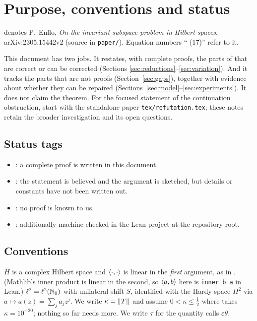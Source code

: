 \section{Purpose, conventions and status}

\paper{} denotes P.~Enflo, \emph{On the invariant subspace problem in Hilbert spaces},
arXiv:2305.15442v2 (source in \texttt{paper/}). Equation numbers ``\paper{} (17)'' refer to it.

This document has two jobs. It restates, with complete proofs, the parts of \paper{} that are
correct or can be corrected (Sections \ref{sec:reductions}--\ref{sec:variation}). And it tracks
the parts that are not proofs (Section~\ref{sec:gaps}), together with evidence about whether they
can be repaired (Sections~\ref{sec:model}--\ref{sec:experiments}). It does not claim the theorem.
For the focused statement of the continuation obstruction, start with the standalone paper
\texttt{tex/refutation.tex}; these notes retain the broader investigation and its open questions.

\subsection*{Status tags}
\begin{itemize}[leftmargin=2em]
\item \stproved: a complete proof is written in this document.
\item \stoutline: the statement is believed and the argument is sketched, but details or
constants have not been written out.
\item \stopen: no proof is known to us.
\item {}: additionally machine-checked in the Lean project at the repository root.
\end{itemize}

\subsection*{Conventions}
$H$ is a complex Hilbert space and $\langle \cdot,\cdot\rangle$ is linear in the \emph{first} argument, as in
\paper{}. (Mathlib's inner product is linear in the second, so $\langle a,b\rangle$ here is
\texttt{inner b a} in Lean.) $\ell^2=\ell^2(\mathbb{N}_0)$ with unilateral shift $S$, identified with the
Hardy space $H^2$ via $a\mapsto a(z)=\sum_j a_jz^j$. We write $\kappa=\lVert T\rVert$ and assume
$0<\kappa\le\frac12$ where \paper{} takes $\kappa=10^{-20}$; nothing so far needs more.
We write $\tau$ for the quantity \paper{} calls $\varepsilon\theta$.

